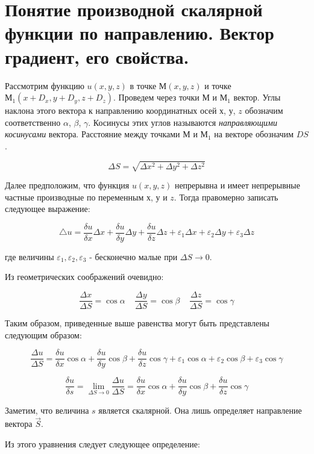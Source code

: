 \documentclass[a4paper,14pt]{article}
\begin{document}
    \section{Понятие производной скалярной функции по направлению. Вектор градиент, его свойства.}

    Рассмотрим функцию $u(x, y, z)$ в точке $М(x,y,z)$ и точке $М_1(x+D_x,y+D_y,z+D_z)$. 
    Проведем через точки $М$ и $М_1$ вектор. Углы наклона этого вектора к направлению координатных осей $х$, $у$, $z$ обозначим соответственно $\alpha$, $\beta$, $\gamma$. 
    Косинусы этих углов называются \textit{направляющими косинусами} вектора.
    Расстояние между точками $М$ и $М_1$ на векторе обозначим $DS$.

    $$\Delta{S}=\sqrt{\Delta{x^2}+\Delta{y^2}+\Delta{z^2}}$$

    Далее предположим, что функция $u(x,y,z)$ непрерывна и имеет непрерывные частные производные по переменным $х$, $у$ и $z$. 
    Тогда правомерно записать следующее выражение:

    $$\triangle{u}=\frac{\delta{u}}{\delta{x}}\Delta{x}+\frac{\delta{u}}{\delta{y}}\Delta{y}+\frac{\delta{u}}{\delta{z}}\Delta{z}+\varepsilon_1\Delta{x}+\varepsilon_2\Delta{y}+\varepsilon_3\Delta{z}$$

    где величины $\varepsilon_1,\varepsilon_2,\varepsilon_3$ - бесконечно малые при $\Delta{S}\rightarrow{0}$.

    Из геометрических соображений очевидно:

    $$\frac{\Delta{x}}{\Delta{S}}=\cos{\alpha}\;\;\;\;\frac{\Delta{y}}{\Delta{S}}=\cos{\beta}\;\;\;\;\frac{\Delta{z}}{\Delta{S}}=\cos{\gamma}$$

    Таким образом, приведенные выше равенства могут быть представлены следующим образом:

    $$\frac{\Delta{u}}{\Delta{S}}=\frac{\delta{u}}{\delta{x}}\cos{\alpha}+\frac{\delta{u}}{\delta{y}}\cos{\beta}+\frac{\delta{u}}{\delta{z}}\cos{\gamma}+\varepsilon_1\cos{\alpha}+\varepsilon_2\cos{\beta}+\varepsilon_3\cos{\gamma}$$

    $$\frac{\delta{u}}{\delta{s}}=\lim_{\Delta{S}\to{0}}\frac{\Delta{u}}{\Delta{S}}=\frac{\delta{u}}{\delta{x}}\cos{\alpha}+\frac{\delta{u}}{\delta{y}}\cos{\beta}+\frac{\delta{u}}{\delta{z}}\cos{\gamma}$$

    Заметим, что величина $s$ является скалярной. Она лишь определяет направление вектора $\vec{S}$.

    Из этого уравнения следует следующее определение:
\end{document}

